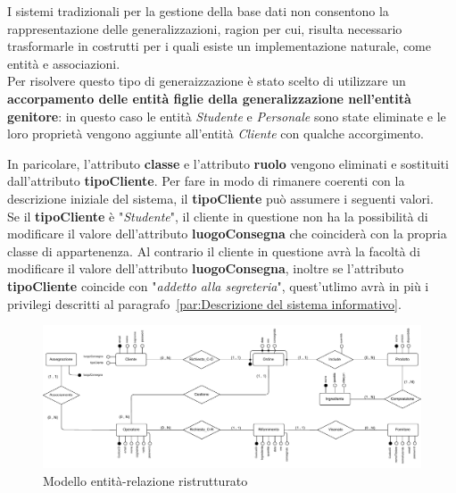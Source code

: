 \documentclass[12pt,a4paper]{article}
\begin{document}
    \vspace{8pt}
    \noindent
    I sistemi tradizionali per la gestione della base dati non consentono la rappresentazione delle generalizzazioni, ragion per cui, risulta necessario trasformarle in costrutti per i quali esiste un implementazione naturale, come entità e associazioni.\\
    Per risolvere questo tipo di generaizzazione è stato scelto di utilizzare un \textbf{accorpamento delle entità figlie della generalizzazione nell'entità genitore}: in questo caso le entità \textit{Studente} e \textit{Personale} sono state eliminate e le loro proprietà vengono aggiunte all'entità \textit{Cliente} con qualche accorgimento.
    
    \vspace{8pt}
    \noindent
    In paricolare, l'attributo \textbf{classe} e l'attributo \textbf{ruolo} vengono eliminati e sostituiti dall'attributo \textbf{tipoCliente}. Per fare in modo di rimanere coerenti con la descrizione iniziale del sistema, il \textbf{tipoCliente} può assumere i seguenti valori.\\
    Se il \textbf{tipoCliente} è "\textit{Studente}", il cliente in questione non ha la possibilità di modificare il valore dell'attributo \textbf{luogoConsegna} che coinciderà con la propria classe di appartenenza.
    Al contrario il cliente in questione avrà la facoltà di modificare il valore dell'attributo \textbf{luogoConsegna}, inoltre se l'attributo \textbf{tipoCliente} coincide con "\textit{addetto alla segreteria}", quest'utlimo avrà in più i privilegi descritti al paragrafo~\ref{par:Descrizione del sistema informativo}.\\
    \begin{figure}[H]
        \centering
        \vspace{-20pt}  %
        \includegraphics[width=\textwidth]{figures/Conceptual_model2.pdf}
        \vspace{-20pt}  %
        \caption{Modello entità-relazione ristrutturato}
        \label{fig:Conceptual_model2}
    \end{figure} 
    
\end{document}
